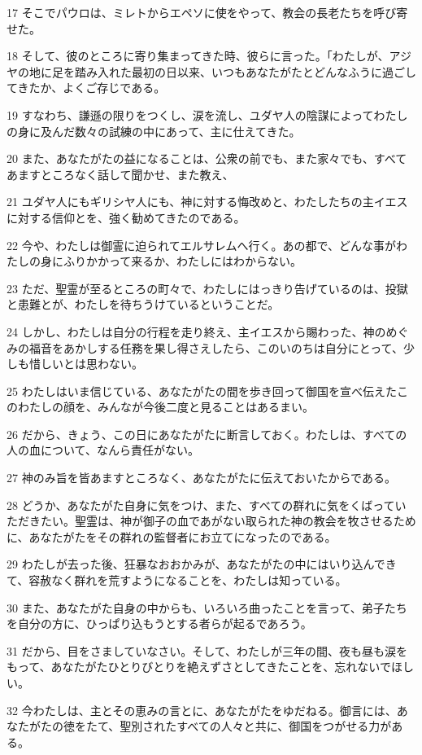 \par 17 そこでパウロは、ミレトからエペソに使をやって、教会の長老たちを呼び寄せた。
\par 18 そして、彼のところに寄り集まってきた時、彼らに言った。「わたしが、アジヤの地に足を踏み入れた最初の日以来、いつもあなたがたとどんなふうに過ごしてきたか、よくご存じである。
\par 19 すなわち、謙遜の限りをつくし、涙を流し、ユダヤ人の陰謀によってわたしの身に及んだ数々の試練の中にあって、主に仕えてきた。
\par 20 また、あなたがたの益になることは、公衆の前でも、また家々でも、すべてあますところなく話して聞かせ、また教え、
\par 21 ユダヤ人にもギリシヤ人にも、神に対する悔改めと、わたしたちの主イエスに対する信仰とを、強く勧めてきたのである。
\par 22 今や、わたしは御霊に迫られてエルサレムへ行く。あの都で、どんな事がわたしの身にふりかかって来るか、わたしにはわからない。
\par 23 ただ、聖霊が至るところの町々で、わたしにはっきり告げているのは、投獄と患難とが、わたしを待ちうけているということだ。
\par 24 しかし、わたしは自分の行程を走り終え、主イエスから賜わった、神のめぐみの福音をあかしする任務を果し得さえしたら、このいのちは自分にとって、少しも惜しいとは思わない。
\par 25 わたしはいま信じている、あなたがたの間を歩き回って御国を宣べ伝えたこのわたしの顔を、みんなが今後二度と見ることはあるまい。
\par 26 だから、きょう、この日にあなたがたに断言しておく。わたしは、すべての人の血について、なんら責任がない。
\par 27 神のみ旨を皆あますところなく、あなたがたに伝えておいたからである。
\par 28 どうか、あなたがた自身に気をつけ、また、すべての群れに気をくばっていただきたい。聖霊は、神が御子の血であがない取られた神の教会を牧させるために、あなたがたをその群れの監督者にお立てになったのである。
\par 29 わたしが去った後、狂暴なおおかみが、あなたがたの中にはいり込んできて、容赦なく群れを荒すようになることを、わたしは知っている。
\par 30 また、あなたがた自身の中からも、いろいろ曲ったことを言って、弟子たちを自分の方に、ひっぱり込もうとする者らが起るであろう。
\par 31 だから、目をさましていなさい。そして、わたしが三年の間、夜も昼も涙をもって、あなたがたひとりびとりを絶えずさとしてきたことを、忘れないでほしい。
\par 32 今わたしは、主とその恵みの言とに、あなたがたをゆだねる。御言には、あなたがたの徳をたて、聖別されたすべての人々と共に、御国をつがせる力がある。
